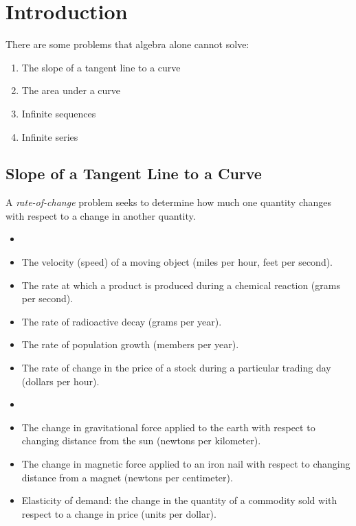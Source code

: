 \documentclass[letterpaper,12pt,fleqn]{article}
\begin{document}
\section*{Introduction}

There are some problems that algebra alone cannot solve:

\begin{enumerate}
\item The slope of a tangent line to a curve
\item The area under a curve
\item Infinite sequences
\item Infinite series
\end{enumerate}

\subsection*{Slope of a Tangent Line to a Curve}

\bigskip

\begin{definition}
  A \emph{rate-of-change} problem seeks to determine how much one quantity changes with respect to a change in
  another quantity.
\end{definition}

\begin{examples}
  \begin{itemize}[left=0in]
  \item[]
  \item The velocity (speed) of a moving object (miles per hour, feet per second).
  \item The rate at which a product is produced during a chemical reaction (grams per second).
  \item The rate of radioactive decay (grams per year).
  \item The rate of population growth (members per year).
  \item The rate of change in the price of a stock during a particular trading day (dollars per hour).
  \end{itemize}
\end{examples}

\begin{examples}
  \begin{itemize}[left=0in]
  \item[]
  \item The change in gravitational force applied to the earth with respect to changing distance from the sun
    (newtons per kilometer).
  \item The change in magnetic force applied to an iron nail with respect to changing distance from a magnet (newtons
    per centimeter).
  \item Elasticity of demand: the change in the quantity of a commodity sold with respect to a change in price
    (units per dollar).
  \end{itemize}
\end{examples}
\end{document}
